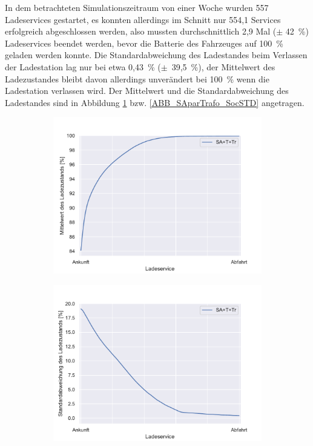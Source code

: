 In dem betrachteten Simulationszeitraum von einer Woche wurden 557 Ladeservices gestartet, es konnten allerdings im Schnitt nur 554,1 Services erfolgreich abgeschlossen werden, also mussten durchschnittlich 2,9 Mal ($\pm$ 42~\%) Ladeservices beendet werden, bevor die Batterie des Fahrzeuges auf 100~\% geladen werden konnte. Die Standardabweichung des Ladestandes beim Verlassen der Ladestation lag nur bei etwa 0,43~\% ($\pm$~39,5~\%), der Mittelwert des Ladezustandes bleibt davon allerdings unverändert bei 100~\% wenn die Ladestation verlassen wird. Der Mittelwert und die Standardabweichung des Ladestandes sind in Abbildung \ref{ABB_SAparTrafo_SocMEAN} bzw. \ref{ABB_SAparTrafo_SocSTD} angetragen.\\
\begin{figure}
	\begin{subfigure}{0.49\linewidth}
		\includegraphics[width=\linewidth]{img/SA_par_trafo/SlottedAloha_participants_VDE_tau_trafo_15_soc_mean.pdf}
        \label{ABB_SAparTrafo_SocMEAN}
	\end{subfigure}
	\begin{subfigure}{0.49\linewidth}
		\includegraphics[width=\linewidth]{img/SA_par_trafo/SlottedAloha_participants_VDE_tau_trafo_15_soc_std.pdf}

\end{subfigure}
\end{figure}
